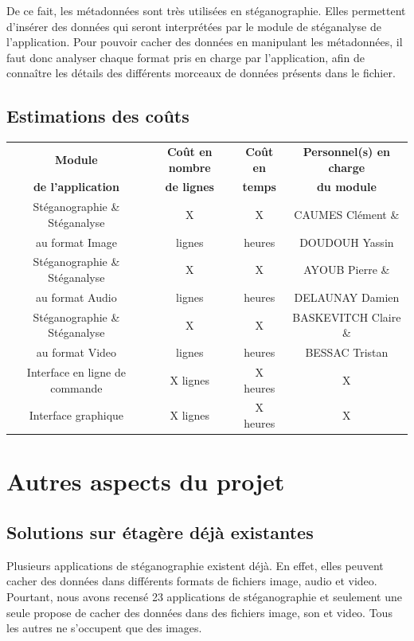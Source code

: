 \documentclass[11pt]{article}
\begin{document}
De ce fait, les métadonnées sont très utilisées en stéganographie. Elles permettent d'insérer des données qui seront interprétées par le module de stéganalyse de l'application. 
Pour pouvoir cacher des données en manipulant les métadonnées, il faut donc analyser chaque format pris en charge par l'application, afin de connaître les détails des différents morceaux de données présents dans le fichier. 

\subsection{Estimations des coûts}
\begin{tabular}{|c|c|c|c|}
  \hline
  \textbf{Module} & \textbf{Coût en nombre} & \textbf{Coût en} & \textbf{Personnel(s) en charge} \\
   \textbf{de l'application} & \textbf{de lignes} & \textbf{temps} & \textbf{du module} \\
  \hline
  Stéganographie \& Stéganalyse & X & X & CAUMES Clément \&\\
   au format Image & lignes & heures & DOUDOUH Yassin\\
  \hline
  Stéganographie \& Stéganalyse & X & X & AYOUB Pierre \&\\
   au format Audio & lignes & heures & DELAUNAY Damien\\
  \hline
  Stéganographie \& Stéganalyse & X & X & BASKEVITCH Claire \&\\
   au format Video & lignes & heures & BESSAC Tristan\\
  \hline
  Interface en ligne de commande & X lignes & X heures & X\\ 
  \hline
  Interface graphique & X lignes & X heures & X\\
  \hline
\end{tabular}

\section{Autres aspects du projet}
\subsection{Solutions sur étagère déjà existantes}
Plusieurs applications de stéganographie existent déjà. En effet, elles peuvent cacher des données dans différents formats de fichiers image, audio et video. 
Pourtant, nous avons recensé 23 applications de stéganographie et seulement une seule propose de cacher des données dans des fichiers image, son et video. 
Tous les autres ne s'occupent que des images. 
\end{document}
